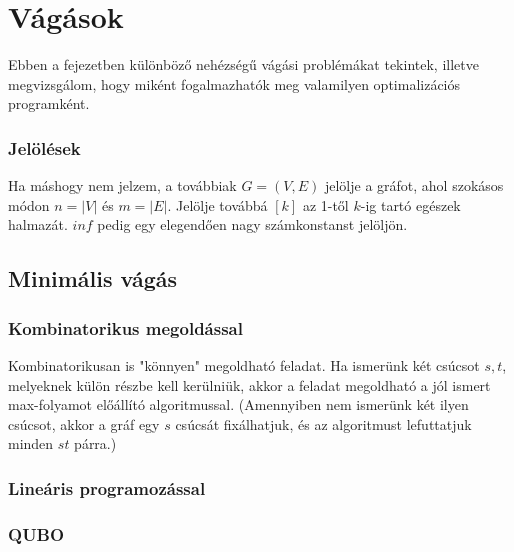 
\chapter{Vágások}


Ebben a fejezetben különböző nehézségű vágási problémákat tekintek, illetve megvizsgálom, hogy miként fogalmazhatók meg valamilyen optimalizációs programként.

\subsection{Jelölések}
Ha máshogy nem jelzem, a továbbiak $G=(V,E)$ jelölje a gráfot, ahol szokásos módon $n=|V|$ és $m=|E|$. Jelölje továbbá $[k]$ az 1-től $k$-ig tartó egészek halmazát. $inf$ pedig egy elegendően nagy számkonstanst jelöljön.

\section{Minimális vágás}

\subsection{Kombinatorikus megoldással}

Kombinatorikusan is "könnyen" megoldható feladat. Ha ismerünk két csúcsot $s, t$, melyeknek külön részbe kell kerülniük, akkor a feladat megoldható a jól ismert max-folyamot előállító algoritmussal. (Amennyiben nem ismerünk két ilyen csúcsot, akkor a gráf egy $s$ csúcsát fixálhatjuk, és az algoritmust lefuttatjuk minden $st$ párra.)

\subsection{Lineáris programozással}

\subsection{QUBO}


